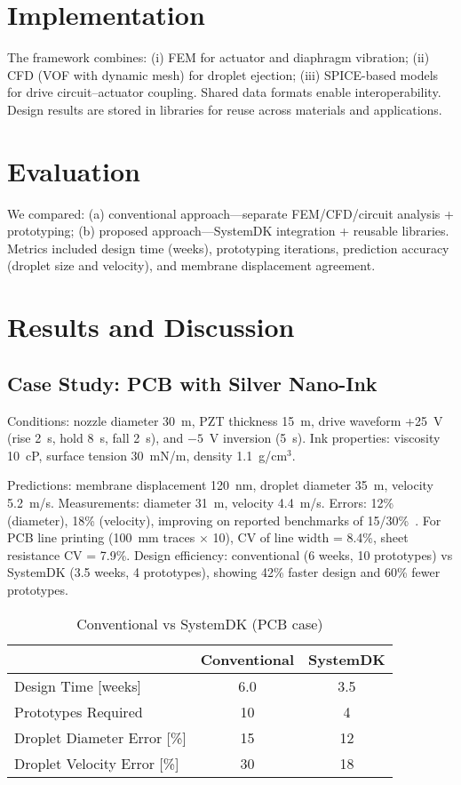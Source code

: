 \documentclass[conference]{IEEEtran}
\begin{document}
\section{Implementation}
The framework combines: (i) FEM for actuator and diaphragm vibration; (ii) CFD (VOF with dynamic mesh) for droplet ejection; (iii) SPICE-based models for drive circuit--actuator coupling. Shared data formats enable interoperability. Design results are stored in libraries for reuse across materials and applications.

\section{Evaluation}
We compared: (a) conventional approach---separate FEM/CFD/circuit analysis + prototyping; (b) proposed approach---SystemDK integration + reusable libraries. Metrics included design time (weeks), prototyping iterations, prediction accuracy (droplet size and velocity), and membrane displacement agreement.

\section{Results and Discussion}
\subsection{Case Study: PCB with Silver Nano-Ink}
Conditions: nozzle diameter 30~\textmu m, PZT thickness 15~\textmu m, drive waveform +25~V (rise 2~\textmu s, hold 8~\textmu s, fall 2~\textmu s), and $-5$~V inversion (5~\textmu s). Ink properties: viscosity 10~cP, surface tension 30~mN/m, density 1.1~g/cm$^3$.

Predictions: membrane displacement 120~nm, droplet diameter 35~\textmu m, velocity 5.2~m/s. Measurements: diameter 31~\textmu m, velocity 4.4~m/s. Errors: 12\% (diameter), 18\% (velocity), improving on reported benchmarks of 15/30\%~\cite{boccio2003,lei2012}. For PCB line printing (100~mm traces $\times$ 10), CV of line width = 8.4\%, sheet resistance CV = 7.9\%. Design efficiency: conventional (6 weeks, 10 prototypes) vs SystemDK (3.5 weeks, 4 prototypes), showing 42\% faster design and 60\% fewer prototypes.

\begin{table}[t]
\centering
\caption{Conventional vs SystemDK (PCB case)}
\begin{tabular}{lcc}
\toprule
 & Conventional & SystemDK \\
\midrule
Design Time [weeks] & 6.0 & 3.5 \\
Prototypes Required & 10  & 4   \\
Droplet Diameter Error [\%] & 15 & 12 \\
Droplet Velocity Error [\%] & 30 & 18 \\
\bottomrule
\end{tabular}
\label{tab:comparison}
\end{table}
\end{document}
